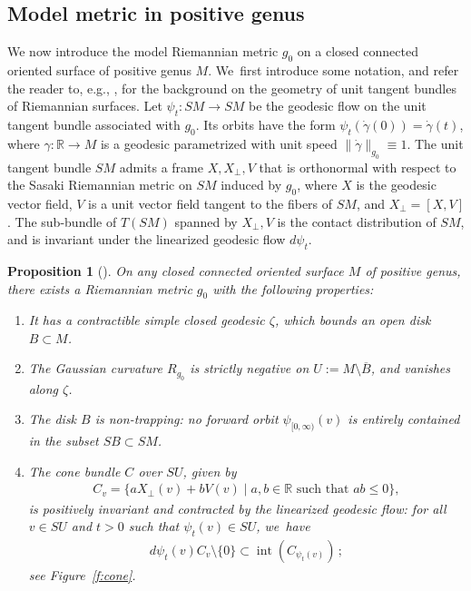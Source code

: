 \documentclass[11pt]{article}
\let\sep\mid
\newcommand{\R}{\mathbb{R}}
\DeclareMathOperator{\interior}{int}
\theoremstyle{plain}
\newtheorem{Prop}[Thm]{Proposition}
\theoremstyle{definition}
\begin{document}
\subsection{Model metric in positive genus}
We now introduce the model Riemannian metric $g_0$ on a closed connected oriented surface of positive genus $M$. We~first introduce some notation, and refer the reader to, e.g., \cite[\S1.11]{Guillarmou:2024aa}, for the background on the geometry of unit tangent bundles of Riemannian surfaces.
Let $\psi_t:SM\to SM$ be the geodesic flow on the unit tangent bundle associated with $g_0$. Its orbits have the form $\psi_t(\dot\gamma(0))=\dot\gamma(t)$, where $\gamma:\R\to M$ is a geodesic parametrized with unit speed $\|\dot\gamma\|_{g_0}\equiv1$. The unit tangent bundle $SM$ admits a frame $X,X_\perp,V$ that is orthonormal with respect to the Sasaki Riemannian metric on $SM$ induced by $g_0$, where $X$ is the geodesic vector field, $V$ is a unit vector field tangent to the fibers of $SM$, and $X_\perp=[X,V]$. The sub-bundle of $T(SM)$ spanned by $X_\perp,V$ is the contact distribution of $SM$, and is invariant under the linearized geodesic flow $d\psi_t$.

\begin{Prop}[\cite{Donnay:1988ab,Burns:1989aa}]
\label{p:model_metric_positive_genus}
On any closed connected oriented surface $M$ of positive genus, there exists a Riemannian metric $g_0$ with the following properties:
\begin{enumerate}
\item\label{p:model_metric_positive_genusi}
It has a contractible simple closed geodesic $\zeta$, which bounds an open disk $B\subset M$.

\item\label{p:model_metric_positive_genusii}
The Gaussian curvature $R_{g_0}$ is strictly negative on $U:=M\setminus\overline B$, and vanishes along $\zeta$.

\item\label{p:model_metric_positive_genusiii}
The disk $B$ is non-trapping: no forward orbit $\psi_{[0,\infty)}(v)$ is entirely contained in the subset $SB\subset SM$.

\item\label{p:model_metric_positive_genusiv}
The cone bundle $C$ over $SU$, given by
\begin{align}
\label{e:cone_field}
C_v
=
\big\{
aX_\perp(v) + b V(v)\sep
a,b\in\R\mbox{ such that }ab\leq0
\big\},
\end{align}
is positively invariant and contracted by the linearized geodesic flow: for all $v\in SU$ and $t>0$ such that $\psi_t(v)\in SU$, we~have
\begin{align*}
d\psi_t(v)C_v\setminus\{0\}\subset \interior(C_{\psi_t(v)})\,;
\end{align*}
see Figure~\ref{f:cone}.
\end{enumerate}
\end{Prop}
\end{document}
